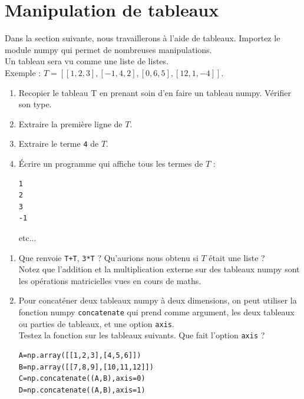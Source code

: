 \section{Manipulation de tableaux}
\begin{defn}
Dans la section suivante, nous travaillerons \` a l'aide de tableaux. Importez le module numpy qui permet de nombreuses manipulations.\\
Un tableau sera vu comme une liste de listes. \\
Exemple : $T=[[1,2,3],[-1,4,2],[0,6,5],[12,1,-4]]$.
\end{defn}

\begin{exercice}
\begin{enumerate}
\item Recopier le tableau T en prenant soin d'en faire un tableau numpy. V\' erifier son type.
\item Extraire la premi\` ere ligne de $T$.
\item Extraire le terme \verb?4? de $T$.
\item \' Ecrire un programme qui affiche tous les termes de $T$ :
\begin{verbatim}
1
2
3
-1
\end{verbatim}
etc...
\end{enumerate}
\end{exercice}

\begin{exercice}
\begin{enumerate}
\item Que renvoie \verb?T+T?, \verb?3*T? ? Qu'aurions nous obtenu si $T$ \' etait une liste ?\\
Notez que l'addition et la multiplication externe sur des tableaux numpy sont les op\' erations matricielles vues en cours de maths.
\item Pour concat\' ener deux tableaux numpy \` a deux dimensions, on peut utiliser la fonction numpy \verb?concatenate? qui prend comme argument, les deux tableaux ou parties de tableaux, et une option \verb?axis?.\\
Testez la fonction sur les tableaux suivants. Que fait l'option \verb?axis? ?
\begin{verbatim}
A=np.array([[1,2,3],[4,5,6]])
B=np.array([[7,8,9],[10,11,12]])
C=np.concatenate((A,B),axis=0)
D=np.concatenate((A,B),axis=1)
\end{verbatim}
\end{enumerate}
\end{exercice}

